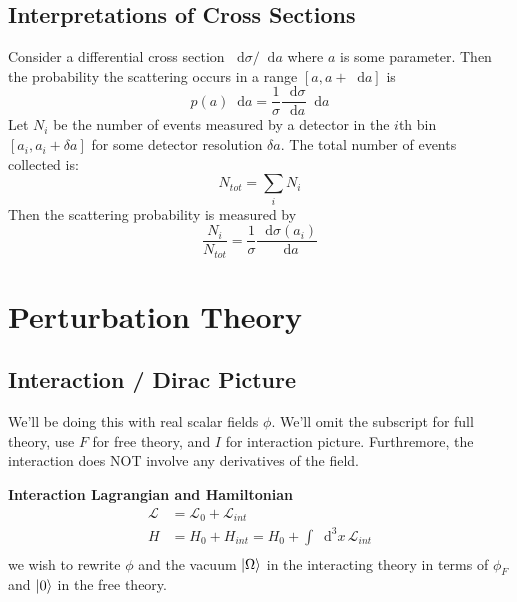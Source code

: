\documentclass[12pt]{article}
\newcommand{\diff}{\mathop{}\!\mathrm{d}}
\theoremstyle{definition}
\begin{document}
\subsection{Interpretations of Cross Sections}
Consider a differential cross section $\diff \sigma / \diff a$ where $a$ is some parameter. Then the probability
the scattering occurs in a range $[a, a + \diff a]$ is
\begin{equation*}
    p(a) \diff a = \frac{1}{\sigma} \frac{\diff \sigma}{\diff a} \diff a
\end{equation*}
Let $N_i$ be the number of events measured by a detector in the $i$th bin $[a_i, a_i + \delta a]$ for some
detector resolution $\delta a$. The total number of events collected is:
\begin{equation*}
    N_{tot} = \sum_i N_i 
\end{equation*}
Then the scattering probability is measured by
\begin{equation*}
    \frac{N_i}{N_{tot}} = \frac{1}{\sigma} \frac{\diff \sigma(a_i)}{\diff a} 
\end{equation*}


\section{Perturbation Theory}

\subsection{Interaction / Dirac Picture}
We'll be doing this with real scalar fields $\phi$. We'll omit the subscript for full theory, use
$F$ for free theory, and $I$ for interaction picture. Furthremore, the interaction does NOT involve
any derivatives of the field. 

\textbf{Interaction Lagrangian and Hamiltonian}
\begin{equation*}
\begin{split}
    \mathcal{L} &= \mathcal{L}_0 + \mathcal{L}_{int} \\
    H &= H_0 + H_{int} = H_0 + \int \diff^3 x \, \mathcal{L}_{int} \\
\end{split}
\end{equation*}
we wish to rewrite $\phi$ and the vacuum $\ket{\Omega}$ in the interacting theory in terms of $\phi_F$ and
$\ket{0}$ in the free theory.
\end{document}
